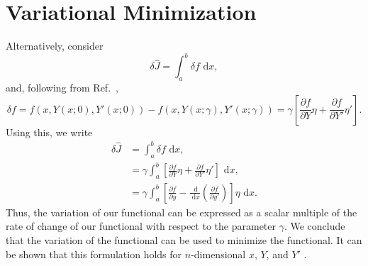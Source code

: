\section{Variational Minimization}
Alternatively, consider
\begin{equation}
\delta\hat J = \int_a^b{\delta f}\text{ d}x,
\end{equation}
and, following from Ref.~\cite{cornelius1970variational},
\begin{equation}
\delta f = f(x,Y(x;0),Y'(x;0))-f(x,Y(x;\gamma),Y'(x;\gamma)) = \gamma\left[\frac{\partial f}{\partial Y}\eta+\frac{\partial f}{\partial Y'}\eta'\right].
\end{equation}
Using this, we write
\begin{align}
\delta\hat J &= \int_a^b{\delta f}\text{ d}x,\\
             &= \gamma\int_a^b{\left[\frac{\partial f}{\partial Y}\eta+\frac{\partial f}{\partial Y'}\eta'\right]}\text{ d}x,\\
             &= \gamma\int_a^b{\left[\frac{\partial f}{\partial y}-\frac{\text{ d}}{\text{ d}x}\left(\frac{\partial f}{\partial y'}\right)\right]}\eta\text{ d}x.
\end{align}
Thus, the variation of our functional can be expressed as a scalar multiple of the rate of change of our functional with respect to the parameter $\gamma$. We conclude that the variation of the functional can be used to minimize the functional. It can be shown  that this formulation holds for $n$-dimensional $x$, $Y$, and $Y'$ \cite{cornelius1970variational}.

